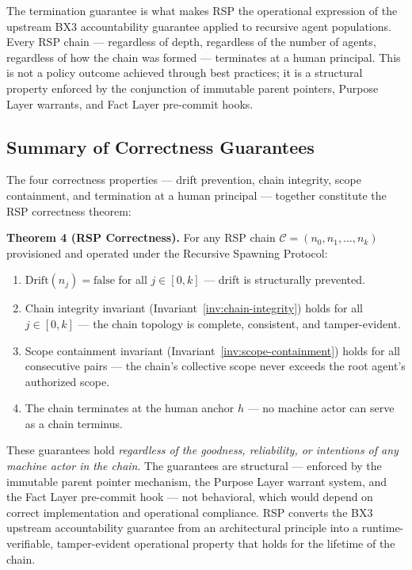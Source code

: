 The termination guarantee is what makes RSP the operational expression of the upstream BX3 accountability guarantee applied to recursive agent populations. Every RSP chain — regardless of depth, regardless of the number of agents, regardless of how the chain was formed — terminates at a human principal. This is not a policy outcome achieved through best practices; it is a structural property enforced by the conjunction of immutable parent pointers, Purpose Layer warrants, and Fact Layer pre-commit hooks.

\subsection{Summary of Correctness Guarantees}
\label{sec:rs-correctness-summary}

The four correctness properties — drift prevention, chain integrity, scope containment, and termination at a human principal — together constitute the RSP correctness theorem:

\begin{mdframed}[style=theorem]
\textbf{Theorem 4 (RSP Correctness).}
For any RSP chain $\mathcal{C} = (n_0, n_1, \ldots, n_k)$ provisioned and operated under the Recursive Spawning Protocol:
\begin{enumerate}
    \item[(RSP-C1)] $\text{Drift}(n_j) = \text{false}$ for all $j \in [0, k]$ — drift is structurally prevented.
    \item[(RSP-C2)] Chain integrity invariant (Invariant~\ref{inv:chain-integrity}) holds for all $j \in [0, k]$ — the chain topology is complete, consistent, and tamper-evident.
    \item[(RSP-C3)] Scope containment invariant (Invariant~\ref{inv:scope-containment}) holds for all consecutive pairs — the chain's collective scope never exceeds the root agent's authorized scope.
    \item[(RSP-C4)] The chain terminates at the human anchor $h$ — no machine actor can serve as a chain terminus.
\end{enumerate}
\end{mdframed}

These guarantees hold \emph{regardless of the goodness, reliability, or intentions of any machine actor in the chain}. The guarantees are structural — enforced by the immutable parent pointer mechanism, the Purpose Layer warrant system, and the Fact Layer pre-commit hook — not behavioral, which would depend on correct implementation and operational compliance. RSP converts the BX3 upstream accountability guarantee from an architectural principle into a runtime-verifiable, tamper-evident operational property that holds for the lifetime of the chain.
